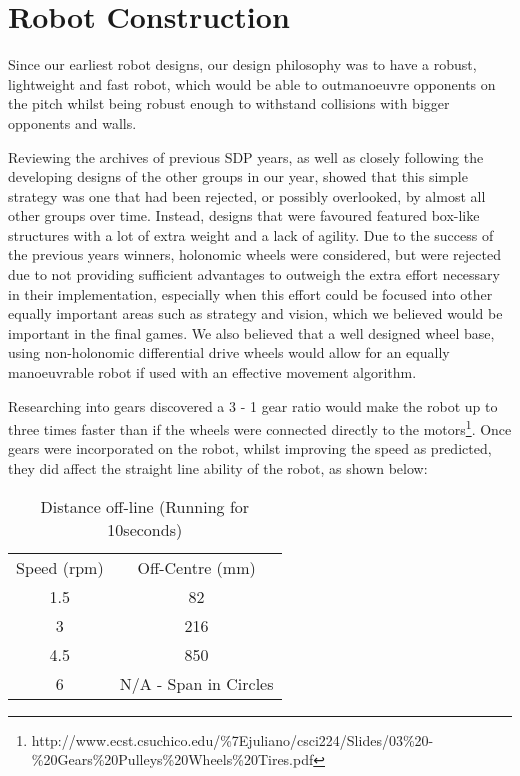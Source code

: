 \section{Robot Construction}

Since our earliest robot designs, our design philosophy was to have a robust, lightweight and fast robot, which would be able to outmanoeuvre opponents on the pitch whilst being robust enough to withstand collisions with bigger opponents and walls. 

Reviewing the archives of previous SDP years, as well as closely following the developing designs of the other groups in our year, showed that this simple strategy was one that had been rejected, or possibly overlooked, by almost all other groups over time. Instead, designs that were favoured featured box-like structures with a lot of extra weight and a lack of agility. Due to the success of the previous years winners, holonomic wheels were considered, but were rejected due to not providing sufficient advantages to outweigh the extra effort necessary in their implementation, especially when this effort could be focused into other equally important areas such as strategy and vision, which we believed would be important in the final games. We also believed that a well designed wheel base, using non-holonomic differential drive wheels would allow for an equally manoeuvrable robot if used with an effective movement algorithm.

Researching into gears discovered a 3 - 1 gear ratio would make the robot up to three times faster than if the wheels were connected directly to the motors\footnote{http://www.ecst.csuchico.edu/\%7Ejuliano/csci224/Slides/03\%20-\%20Gears\%20Pulleys\%20Wheels\%20Tires.pdf}. Once gears were incorporated on the robot, whilst improving the speed as predicted, they did affect the straight line ability of the robot, as shown below:
\begin{table}[ht]
\caption{Distance off-line (Running for 10seconds)}
\centering
\begin{tabular}{c c}
\hline\hline
Speed (rpm) & Off-Centre (mm) \\
1.5 & 82 \\
3 & 216 \\
4.5 & 850 \\
6 & N/A - Span in Circles \\
\hline\hline
\end{tabular}
\label{table:offline}
\end{table}

